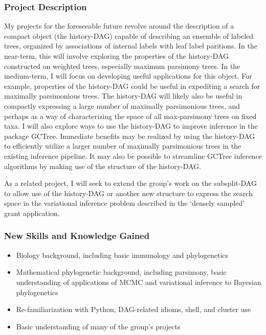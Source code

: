\documentclass{paper}
\begin{document}
\subsubsection*{Project Description}
My projects for the foreseeable future revolve around the description of a compact object (the history-DAG) capable of describing an ensemble of labeled trees, organized by associations of internal labels with leaf label paritions.
In the near-term, this will involve exploring the properties of the history-DAG constructed on weighted trees, especially maximum parsimony trees.
In the medium-term, I will focus on developing useful applications for this object.
For example, properties of the history-DAG could be useful in expediting a search for maximally parsimonious trees.
The history-DAG will likely also be useful in compactly expressing a large number of maximally parsimonious trees, and perhaps as a way of characterizing the space of all max-parsimony trees on fixed taxa.
I will also explore ways to use the history-DAG to improve inference in the package GCTree.
Immediate benefits may be realized by using the history-DAG to efficiently utilize a larger number of maximally parsimonious trees in the existing inference pipeline.
It may also be possible to streamline GCTree inference algorithms by making use of the structure of the history-DAG.

As a related project, I will seek to extend the group's work on the subsplit-DAG to allow use of the history-DAG or another new structure to express the search space in the variational inference problem described in the  `densely sampled' grant application.

\subsubsection*{New Skills and Knowledge Gained}
\begin{itemize}
    \item Biology background, including basic immunology and phylogenetics
    \item Mathematical phylogenetic background, including parsimony, basic understanding of applications of MCMC and variational inference to Bayesian phylogenetics
    \item Re-familiarization with Python, DAG-related idioms, shell, and cluster use
    \item Basic understanding of many of the group's projects
\end{itemize}
\end{document}
